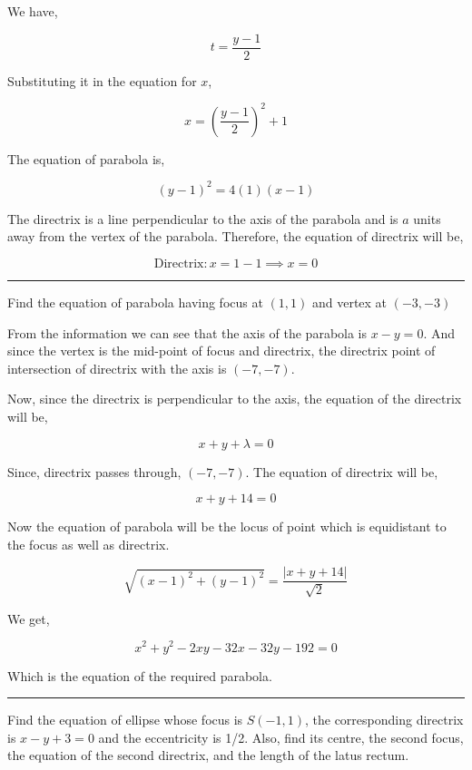 \documentclass[twocolumn]{article}
\begin{document}
We have, 

\[
    t = \frac{y-1}{2}
\]

Substituting it in the equation for \(x\), 

\[
    x = (\frac{y-1}{2})^{2} + 1
\]

The equation of parabola is, 

\[
    (y-1)^{2} = 4(1)(x-1)
\]

The directrix is a line perpendicular to the axis of the parabola and is \(a\) units away from the vertex of the parabola. Therefore, the equation of directrix will be, 

\[
    \boxed{\text{Directrix}: x = 1-1 \implies x = 0} 
\]

\hrule

\begin{question}
    Find the equation of parabola having focus at \((1, 1)\) and vertex at \((-3, -3)\) 
\end{question}

From the information we can see that the axis of the parabola is \(x-y = 0\). And since the vertex is the mid-point of focus and directrix, the directrix point of intersection of directrix with the axis is \((-7, -7)\).

\vspace*{0.1in}

Now, since the directrix is perpendicular to the axis, the equation of the directrix will be, 

\[
    x + y + \lambda = 0 
\]

Since, directrix passes through, \((-7,-7)\). The equation of directrix will be, 

\[
    x+y + 14 = 0
\]

Now the equation of parabola will be the locus of point which is equidistant to the focus as well as directrix. 

\[
    \sqrt{(x-1)^{2} + (y-1)^{2}} = \frac{|x+y+14|}{\sqrt{2} }
\]

We get,  

\[
    \boxed{x^{2} +  y^{2} - 2xy - 32x - 32y- 192 = 0}
\]

Which is the equation of the required parabola. 

\vspace*{0.1in}

\hrule

\begin{question}
    Find the equation of ellipse whose focus is \(S  (-1, 1)\), the corresponding directrix is \(x-y+3 = 0\) and the eccentricity is 1/2. Also, find its centre, the second focus, the equation of the second directrix, and the length of the latus rectum. 
\end{question}
\end{document}
